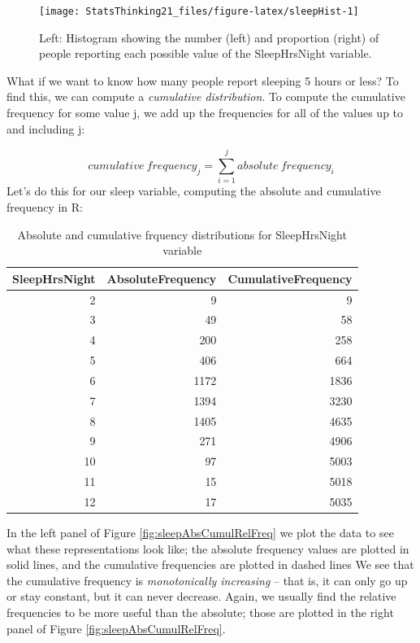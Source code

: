 \documentclass[12pt,]{book}
\theoremstyle{definition}
\theoremstyle{definition}
\theoremstyle{definition}
\theoremstyle{remark}
\begin{document}
\begin{figure}
\texttt{[image: StatsThinking21\_files/figure-latex/sleepHist-1]} \caption{Left: Histogram showing the number (left) and proportion (right) of people reporting each possible value of the SleepHrsNight variable.}\label{fig:sleepHist}
\end{figure}

What if we want to know how many people report sleeping 5 hours or less? To find this, we can compute a \emph{cumulative distribution}. To compute the cumulative frequency for some value j, we add up the frequencies for all of the values up to and including j:

\[
cumulative\ frequency_j = \sum_{i=1}^{j}{absolute\ frequency_i}
\]
Let's do this for our sleep variable, computing the absolute and cumulative frequency in R:

\newpage
\begin{table}

\caption{\label{tab:unnamed-chunk-9}Absolute and cumulative frquency distributions for SleepHrsNight variable}
\centering
\begin{tabular}[t]{r|r|r}
\hline
SleepHrsNight & AbsoluteFrequency & CumulativeFrequency\\
\hline
2 & 9 & 9\\
\hline
3 & 49 & 58\\
\hline
4 & 200 & 258\\
\hline
5 & 406 & 664\\
\hline
6 & 1172 & 1836\\
\hline
7 & 1394 & 3230\\
\hline
8 & 1405 & 4635\\
\hline
9 & 271 & 4906\\
\hline
10 & 97 & 5003\\
\hline
11 & 15 & 5018\\
\hline
12 & 17 & 5035\\
\hline
\end{tabular}
\end{table}

In the left panel of Figure \ref{fig:sleepAbsCumulRelFreq} we plot the data to see what these representations look like; the absolute frequency values are plotted in solid lines, and the cumulative frequencies are plotted in dashed lines We see that the cumulative frequency is \emph{monotonically increasing} -- that is, it can only go up or stay constant, but it can never decrease. Again, we usually find the relative frequencies to be more useful than the absolute; those are plotted in the right panel of Figure \ref{fig:sleepAbsCumulRelFreq}.
\end{document}
